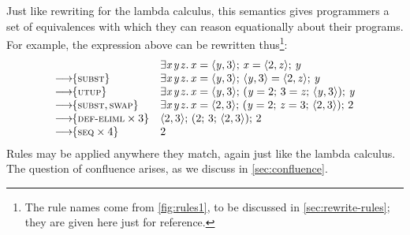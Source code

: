 \documentclass[acmsmall,review,dvipsnames]{acmart}
\newcommand{\Varid}[1]{\mathit{#1}}
\newcommand{\rulename}[1]{\textsc{\small #1}}
\newcommand{\movesto}{\longrightarrow}
\newcommand{\movestoC}[1]{\movesto\!\!\{#1\}}
\newcommand{\movestoR}[1]{\movestoC{\rulename{#1}}}
\newcommand{\movestoRR}[2]{\movestoC{\rulename{#1}, \rulename{#2}}}
\newcommand{\movestoRn}[2]{\movestoC{\rulename{#1} \times #2}}
\begin{document}
Just like rewriting for the lambda calculus, this semantics
gives programmers a set of equivalences with which
they can reason equationally about their programs.
For example, the expression above can be rewritten
thus\footnote{The rule names come from \cref{fig:rules1}, to be discussed in \cref{sec:rewrite-rules}; they
  are given here just for reference.}:
$$
\begin{array}{ll}
                           & \ensuremath{\exists\Varid{x}\hspace{0.3mm}\Varid{y}\hspace{0.3mm}\Varid{z}.\,\Varid{x}\mathrel{=}\langle{}\Varid{y},\mathrm{3}\rangle;\,\Varid{x}\mathrel{=}\langle{}\mathrm{2},\Varid{z}\rangle;\,\Varid{y}} \\
  \movestoR{subst}         & \ensuremath{\exists\Varid{x}\hspace{0.3mm}\Varid{y}\hspace{0.3mm}\Varid{z}.\,\Varid{x}\mathrel{=}\langle{}\Varid{y},\mathrm{3}\rangle;\,\langle{}\Varid{y},\mathrm{3}\rangle\mathrel{=}\langle{}\mathrm{2},\Varid{z}\rangle;\,\Varid{y}} \\
  \movestoR{utup}          & \ensuremath{\exists\Varid{x}\hspace{0.3mm}\Varid{y}\hspace{0.3mm}\Varid{z}.\,\Varid{x}\mathrel{=}\langle{}\Varid{y},\mathrm{3}\rangle;\,(\Varid{y}\mathrel{=}\mathrm{2};\,\mathrm{3}\mathrel{=}\Varid{z};\,\langle{}\Varid{y},\mathrm{3}\rangle);\,\Varid{y}} \\
  \movestoRR{subst}{swap}  & \ensuremath{\exists\Varid{x}\hspace{0.3mm}\Varid{y}\hspace{0.3mm}\Varid{z}.\,\Varid{x}\mathrel{=}\langle{}\mathrm{2},\mathrm{3}\rangle;\,(\Varid{y}\mathrel{=}\mathrm{2};\,\Varid{z}\mathrel{=}\mathrm{3};\,\langle{}\mathrm{2},\mathrm{3}\rangle);\,\mathrm{2}} \\
  \movestoRn{def-eliml}{3} & \ensuremath{\langle{}\mathrm{2},\mathrm{3}\rangle;\,(\mathrm{2};\,\mathrm{3};\,\langle{}\mathrm{2},\mathrm{3}\rangle);\,\mathrm{2}} \\
  \movestoRn{seq}{4}       & \ensuremath{\mathrm{2}}
\end{array}
$$
%
Rules may be applied anywhere they match, again just like the lambda calculus. The question of confluence arises, as we discuss in \cref{sec:confluence}.
\end{document}

